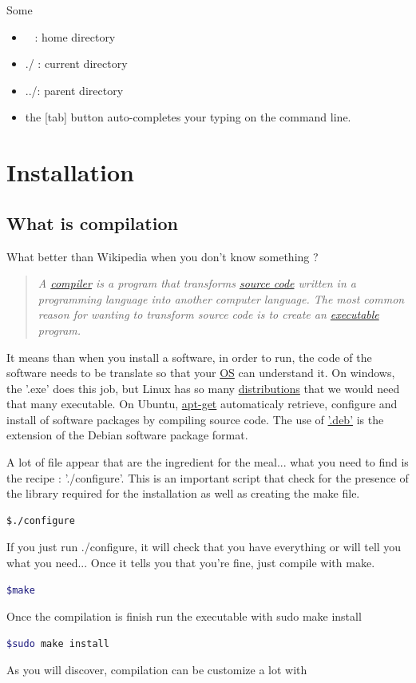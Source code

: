 \documentclass[11pt,a4paper]{report}
\begin{document}
Some
\begin{itemize}
\item ~ : home directory
\item ./ : current directory
\item ../: parent directory
\item the [tab] button auto-completes your typing on the command line.
\end{itemize}


\chapter{Installation}

\section{What is compilation}
What better than Wikipedia when you don't know something ?
\begin{quote} \it
A \href{https://en.wikipedia.org/wiki/Compiler}{compiler} is a program that transforms \href{https://en.wikipedia.org/wiki/Source_code}{source code} written in a programming language into another computer language. The most common reason for wanting to transform source code is to create an \href{https://en.wikipedia.org/wiki/Executable}{executable} program.
\end{quote}
It means than when you install a software, in order to run, the code of the software needs to be translate so that your \href{https://en.wikipedia.org/wiki/Operating_system}{OS} can understand it. On windows, the '.exe' does this job, but Linux has so many \href{https://en.wikipedia.org/wiki/Linux_distribution}{distributions} that we would need that many executable. 
On Ubuntu, \href{http://en.wikipedia.org/wiki/Advanced_Packaging_Tool}{apt-get} automaticaly retrieve, configure and install of software packages by compiling source code. The use of \href {http://en.wikipedia.org/wiki/Deb_(file_format)}{'.deb'} is the extension of the Debian software package format.

A lot of file appear that are the ingredient for the meal... what you need to find is the recipe : './configure'. This is an important script that check for the presence of the library required for the installation as well as creating the make file.
\begin{lstlisting}[language=bash]
    $./configure
\end{lstlisting}
If you just run ./configure, it will check that you have everything or will tell you what you need... Once it tells you that you're fine, just compile with make.
 \begin{lstlisting}[language=bash]
    $make
\end{lstlisting}
Once the compilation is finish run the executable with sudo make install
\begin{lstlisting}[language=bash]
    $sudo make install
\end{lstlisting}
As you will discover, compilation can be customize a lot with
\end{document}
